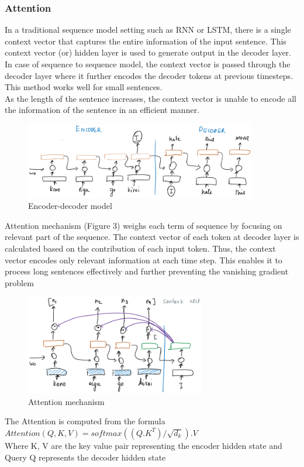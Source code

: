 \subsubsection{Attention}
In a traditional sequence model setting such as RNN or LSTM, there is a single context vector that captures the entire information of the input sentence. This context vector (or) hidden layer is used to generate output in the decoder layer. In case of sequence to sequence model, the context vector is passed through the decoder layer where it further encodes the decoder tokens at previous timesteps. This method works well for small sentences. \\
As the length of the sentence increases, the context vector is unable to encode all the information of the sentence in an efficient manner. \\
\begin{figure}[H]
\centering
\includegraphics[width=0.9\textwidth]{images/rnn.png}
\caption{Encoder-decoder model}
\label{fig:rnn}
\end{figure}

Attention mechanism (Figure 3) weighs each term of sequence by focusing on relevant part of the sequence. The context vector of each token at decoder layer is calculated based on the contribution of each input token. Thus, the context vector encodes only relevant information at each time step. This enables it to process long sentences effectively and further preventing the vanishing gradient problem

\begin{figure}[H]
\centering
\includegraphics[width=0.7\textwidth]{images/attn.png}
\caption{Attention mechanism}
\label{fig:attn}
\end{figure} 
The Attention is computed from the formula \\
\(Attention(Q,K,V) = softmax((Q.K^{T})/ \sqrt{ d_{k} }).V\)
\\ Where K, V are the key value pair representing the encoder hidden state and Query Q represents the decoder hidden state

